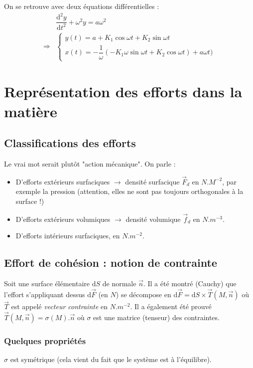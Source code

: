 \documentclass{article}
\newcommand{\deriv}{\mathrm{d}}
\begin{document}
On se retrouve avec deux équations différentielles :
\begin{align*}
& \dfrac{\deriv^2 y}{\deriv t ^2} + \omega^2 y = a \omega^2\\
\Rightarrow & \begin{cases}
y(t) = a + K_1\cos \omega t + K_2\sin\omega t\\
x(t) = -\dfrac{1}{\omega}(-K_1 \omega \sin \omega t + K_2 \cos \omega t) + a \omega t)
\end{cases}
\end{align*}

\section{Représentation des efforts dans la matière}
\subsection{Classifications des efforts}
Le vrai mot serait plutôt "action mécanique". On parle :
\begin{itemize}[label=\textbullet]
\item D'efforts extérieurs surfaciques $\to$ densité surfacique $\vec{F}_d$ en $N.M^{-2}$, par exemple la pression (attention, elles ne sont pas toujours orthogonales à la surface !)
\item D'efforts extérieurs volumiques $\to $ densité volumique $\vec{f}_d$ en $N.m^{-3}$.
\item D'efforts intérieurs surfaciques, en $N.m^{-2}$.
\end{itemize}

\subsection{Effort de cohésion : notion de contrainte}
Soit une surface élémentaire $\deriv S$ de normale $\vec{n}$. Il a été montré (Cauchy) que l'effort s'appliquant dessus $\deriv \vec{F}$ (en $N$) se décompose en $\deriv \vec{F} = \deriv S \times \vec{T} (M,\vec{n})$ où $\vec{T}$ est appelé \emph{vecteur contrainte} en $N.m^{-2}$. Il a également été prouvé $\vec{T}(M,\vec{n})=\sigma (M).\vec{n}$ où $\sigma$ est une matrice (tenseur) des contraintes. 

\subsubsection*{Quelques propriétés}
$\sigma$ est symétrique (cela vient du fait que le système est à l'équilibre).
\end{document}
